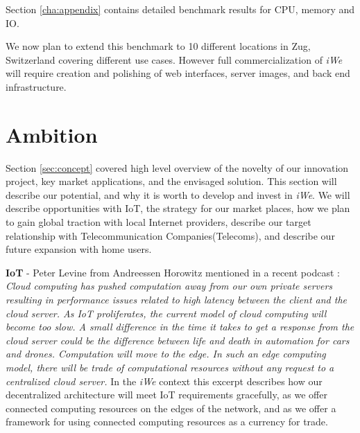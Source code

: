 Section \ref{cha:appendix} contains detailed benchmark results for CPU, memory
and IO.

We now plan to extend this benchmark to 10 different locations in Zug,
Switzerland covering different use cases. However full commercialization of
\textit{iWe} will require creation and polishing of web interfaces, server
images, and back end infrastructure.

\section{Ambition}
\label{sec:ambition}


Section \ref{sec:concept} covered high level overview of the novelty of our
innovation project, key market applications, and the envisaged solution. This
section will describe our potential, and why it is worth to develop and invest
in \textit{iWe}. We will describe opportunities with IoT, the strategy for
our market places, how we plan to gain global traction with local Internet
providers, describe our target relationship with Telecommunication
Companies(Telecoms), and describe our future expansion with home users.

\textbf{IoT} - Peter Levine from Andreessen Horowitz mentioned in a recent
podcast \cite{the-end}: \textit{Cloud computing has pushed computation away from
our own private servers resulting in performance issues related to high latency
between the client and the cloud server. As IoT proliferates, the current model
of cloud computing will become too slow. A small difference in the time it takes
to get a response from the cloud server could be the difference between life and
death in automation for cars and drones.  Computation will move to the edge. In
such an edge computing model, there will be trade of computational resources
without any request to a centralized cloud server.} In the \textit{iWe}
context this excerpt describes how our decentralized architecture will meet IoT
requirements gracefully, as we offer connected computing resources on the edges
of the network, and as we offer a framework for using connected computing
resources as a currency for trade.

